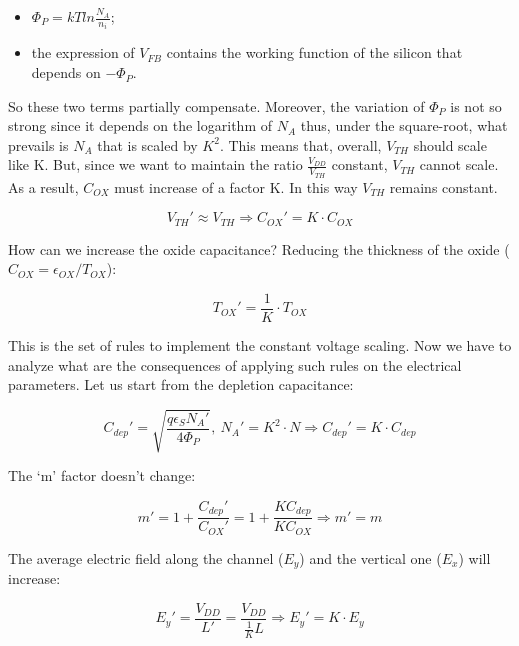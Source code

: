 \documentclass[a4paper, 12pt, twoside, openright]{report}
\begin{document}
\begin{enumerate}
\begin{itemize}
\item $\Phi_P = kTln\frac{N_A}{n_i}$;
\item the expression of $V_{FB}$ contains the working function of the silicon that depends on $-\Phi_P$.
\end{itemize}

So these two terms partially compensate. Moreover, the variation of $\Phi_P$ is not so strong since it depends on the logarithm of $N_{A}$ thus, under the square-root, what prevails is $N_{A}$ that is scaled by $K^{2}$. This means that, overall, $V_{TH}$ should scale like K. But, since we want to maintain the ratio $\frac{V_{DD}}{V_{TH}}$ constant, $V_{TH}$ cannot scale. As a result, $C_{OX}$ must increase of a factor K. In this way $V_{TH}$ remains constant.

	\begin{equation}
	V_{TH}' \approx V_{TH} \Rightarrow C_{OX}' = K \cdot C_{OX}
	\label{}
	\end{equation}

How can we increase the oxide capacitance? Reducing the thickness of the oxide ($C_{OX} = \epsilon_{OX}/T_{OX}$):

	\begin{equation}
	T_{OX}' = \frac{1}{K} \cdot T_{OX}
	\label{}
	\end{equation}

This is the set of rules to implement the constant voltage scaling. Now we have to analyze what are the consequences of applying such rules on the electrical parameters.
Let us start from the depletion capacitance:

	\begin{equation}
	C_{dep}' = \sqrt{\frac{q\epsilon_S N_A'}{4\Phi_P}},\ N_A' = K^2 \cdot N \Rightarrow C_{dep}' = K \cdot C_{dep}
	\label{}
	\end{equation}

The `m' factor doesn't change:

	\begin{equation}
	m' = 1+\frac{C_{dep}'}{C_{OX}'} = 1+ \frac{KC_{dep}}{KC_{OX}} \Rightarrow m' = m
	\label{}
	\end{equation}

The average electric field along the channel ($E_{y}$) and the vertical one ($E_{x}$) will increase:

	\begin{equation}
	E_y' = \frac{V_{DD}}{L'} = \frac{V_{DD}}{\frac{1}{K}L} \Rightarrow E_y' = K \cdot E_y
	\label{}
	\end{equation}


\end{enumerate}
\end{document}
